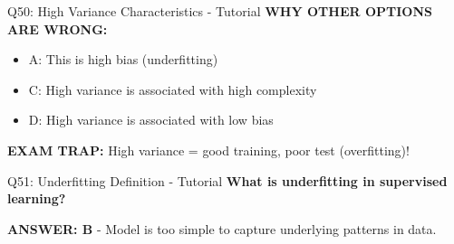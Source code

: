\documentclass[8pt]{beamer}
\begin{document}
\begin{frame}{Q50: High Variance Characteristics - Tutorial}
		\vspace{0.05cm}
		\textcolor{myred}{\textbf{WHY OTHER OPTIONS ARE WRONG:}}
		\begin{itemize}
			\item \textcolor{myred}{A:} This is high bias (underfitting)
			\item \textcolor{myred}{C:} High variance is associated with high complexity
			\item \textcolor{myred}{D:} High variance is associated with low bias
		\end{itemize}
		
		\textcolor{myred}{\textbf{EXAM TRAP:}} High variance = good training, poor test (overfitting)!
	\end{frame}
	
	\begin{frame}{Q51: Underfitting Definition - Tutorial}
		\fontsize{6.5}{7.5}\selectfont
		\textbf{What is underfitting in supervised learning?}
		
		\vspace{0.05cm}
		\textcolor{myblue}{\textbf{ANSWER: B}} - Model is too simple to capture underlying patterns in data.
		

\end{frame}
\end{document}

